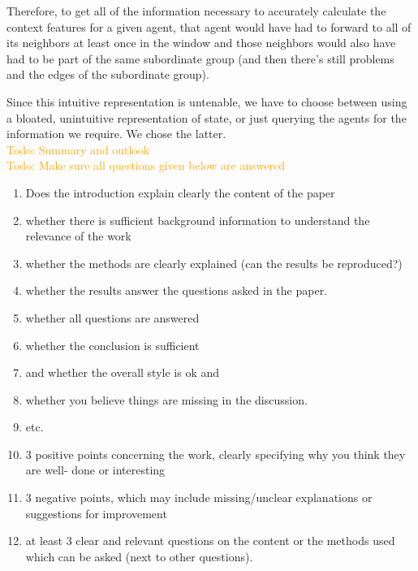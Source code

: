 \documentclass[letterpaper]{article}
\newcommand\todo[1]{\textcolor{orange}{Todo: #1}}
\begin{document}
Therefore, to get all of the information necessary to accurately calculate the context features for a given agent, that agent would have had to forward to all of its neighbors at least once in the window and those neighbors would also have had to be part of the same subordinate group (and then there’s still problems and the edges of the subordinate group).

Since this intuitive representation is untenable, we have to choose between using a bloated, unintuitive representation of state, or just querying the agents for the information we require.  We chose the latter.
\\\todo{Summary and outlook}
\\\todo{Make sure all questions given below are answered}
\begin{enumerate}
 \item Does the introduction explain clearly the content of the paper
 \item whether there is sufficient background information to understand the relevance of the work
 \item whether the methods are clearly explained (can the results be reproduced?)
 \item whether the results answer the questions asked in the paper.
 \item whether all questions are answered
 \item whether the conclusion is sufficient
 \item and whether the overall style is ok and
 \item whether you believe things are missing in the discussion.
 \item etc.
 \item 3 positive points concerning the work, clearly specifying why you think they are well-
       done or interesting
 \item 3 negative points, which may include missing/unclear explanations or suggestions for
       improvement
 \item at least 3 clear and relevant questions on the content or the methods used which can be asked (next to other questions).
\end{enumerate}

\footnotesize


\end{document}
